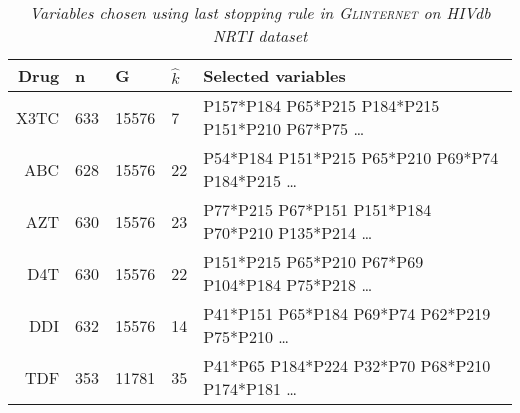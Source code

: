 \begin{table}[ht]
\centering
\begin{tabular}{rllll}
  \hline
  Drug & n & G & $\hat k$& Selected variables \\ 
  \hline
X3TC & 633 & 15576 & 7& P157*P184 P65*P215 P184*P215 P151*P210 P67*P75 \ldots \\ %
ABC & 628 & 15576 & 22&P54*P184 P151*P215 P65*P210 P69*P74 P184*P215 \ldots \\
AZT & 630 & 15576 & 23&P77*P215 P67*P151 P151*P184 P70*P210 P135*P214 \ldots \\
D4T & 630 & 15576 & 22&P151*P215 P65*P210 P67*P69 P104*P184 P75*P218 \ldots \\
DDI & 632 & 15576 & 14&P41*P151 P65*P184 P69*P74 P62*P219 P75*P210 \ldots \\
TDF & 353 & 11781 & 35&P41*P65 P184*P224 P32*P70 P68*P210 P174*P181 \ldots \\
   \hline
\end{tabular}
\caption{\em Variables chosen using \textit{last} stopping rule in
  \textsc{Glinternet} on HIVdb NRTI dataset} 
\label{tab:glintNRTI}
\end{table}

